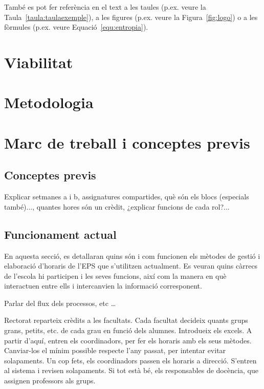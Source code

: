 \documentclass[a4paper,12pt]{ThesisStyle}
\begin{document}
També es pot fer referència en el text a les taules (p.ex. veure la Taula~\ref{taula:taulaexemple}), a les figures (p.ex. veure la Figura~\ref{fig:logo}) o a les fòrmules (p.ex. veure Equació~\ref{equ:entropia}).



\chapter{Viabilitat}
\label{cap:viabilitat}



\chapter{Metodologia}
\label{cap:metodologia}



\chapter{Marc de treball i conceptes previs}  %
\label{cap:marcdetreball}

\section{Conceptes previs}
\label{sec:conceptes_previs}
Explicar setmanes a i b, assignatures compartides, què són els blocs (especials també)..., quantes hores
són un crèdit, ¿explicar funcions de cada rol?... 

\section{Funcionament actual}
\label{sec:funcionament_actual}

En aquesta secció, es detallaran quins són i com funcionen els mètodes de gestió i elaboració d'horaris de l'EPS que s'utilitzen actualment. Es veuran quins càrrecs de l'escola hi participen i les seves funcions, així com la manera en què interactuen entre ells i intercanvien la informació corresponent.

Parlar del flux dels processos, etc \ldots

Rectorat reparteix crèdits a les facultats. Cada facultat decideix quants grups grans, petits, etc. de cada grau en funció dels alumnes. Introdueix els excels.
A partir d'aquí, entren els coordinadors, per fer els horaris amb els seus mètodes. Canviar-los el mínim possible respecte l'any passat, per intentar evitar
solapaments. Un cop fets, els coordinadors passen els horaris a direcció. S'entren al sistema i revisen solapaments. Si tot està bé, els responsables de docència,
que assignen professors als grups. 
\end{document}
